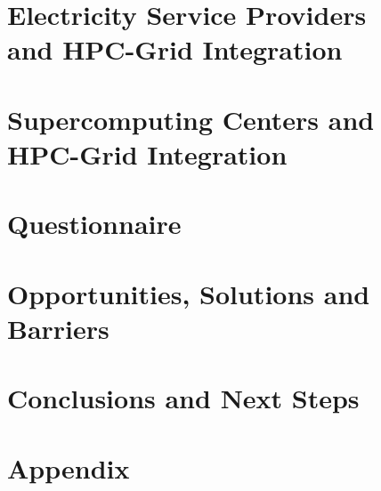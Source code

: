\documentclass{../style/sig-alternate}
\begin{document}
\section{Electricity Service Providers\\
 and HPC-Grid Integration}
\label{sec:ESPintegration}


\section{Supercomputing Centers and \\ HPC-Grid Integration}
\label{sec:supercomputercenters}


\section{Questionnaire} 
\label{sec:questionnaire}


\section{Opportunities, Solutions and\\ Barriers} 

\label{sec:opportunities}

\section{Conclusions and Next Steps}

\label{sec:conclusion}

%
%

%

%

\section*{Appendix}
\label{Appendix}

\end{document}
